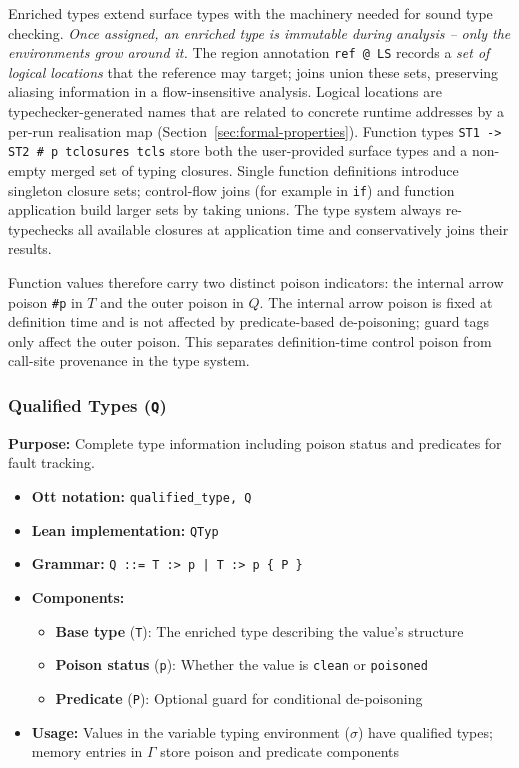 \documentclass[12pt]{article}
\begin{document}
Enriched types extend surface types with the machinery needed for sound type
checking. \emph{Once assigned, an enriched type is \emph{immutable} during
analysis -- only the environments grow around it.} The region annotation
\texttt{ref @ LS} records a \emph{set of logical locations} that the reference
may target; joins union these sets, preserving aliasing information in a
flow-insensitive analysis. Logical locations are typechecker-generated names
that are related to concrete runtime addresses by a per-run realisation map
(Section~\ref{sec:formal-properties}). Function types \texttt{ST1 -> ST2 \# p
tclosures tcls} store both the user-provided surface types and a non-empty
merged set of typing closures. Single function definitions introduce singleton
closure sets; control-flow joins (for example in \texttt{if}) and function
application build larger sets by taking unions. The type system always
re-typechecks all available closures at application time and conservatively
joins their results.

Function values therefore carry two distinct poison indicators: the internal
arrow poison \texttt{\#p} in $T$ and the outer poison in $Q$. The internal arrow
poison is fixed at definition time and is not affected by predicate-based
de-poisoning; guard tags only affect the outer poison. This separates
definition-time control poison from call-site provenance in the type system.

\subsubsection{Qualified Types (\texttt{Q})}
\textbf{Purpose:} Complete type information including poison status and predicates for fault tracking.
\begin{itemize}
    \item \textbf{Ott notation:} \texttt{qualified\_type, Q}
    \item \textbf{Lean implementation:} \texttt{QTyp}
    \item \textbf{Grammar:} \texttt{Q ::= T :> p | T :> p \{ P \}}
    \item \textbf{Components:}
    \begin{itemize}
        \item \textbf{Base type} (\texttt{T}): The enriched type describing the value's structure
        \item \textbf{Poison status} (\texttt{p}): Whether the value is \texttt{clean} or \texttt{poisoned}
        \item \textbf{Predicate} (\texttt{P}): Optional guard for conditional de-poisoning
    \end{itemize}
    \item \textbf{Usage:} Values in the variable typing environment (\texttt{$\sigma$}) have qualified types; memory entries in \texttt{$\Gamma$} store poison and predicate components
\end{itemize}
\end{document}
